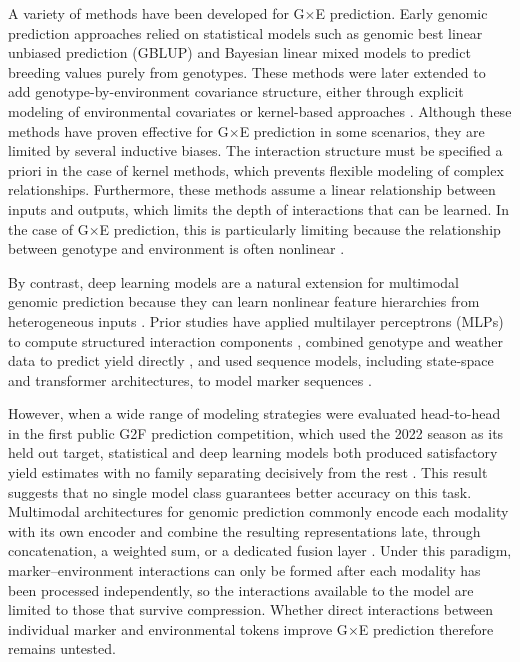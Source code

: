 A variety of methods have been developed for G$\times$E prediction. Early genomic prediction approaches relied on statistical models such as genomic best linear unbiased prediction (GBLUP) \cite{vanraden2008efficient} and Bayesian linear mixed models \cite{meuwissen2001prediction} to predict breeding values purely from genotypes. These methods were later extended to add genotype-by-environment covariance structure, either through explicit modeling of environmental covariates \cite{crossa2017genomic,heslot2014integrating} or kernel-based approaches \cite{jarquin2014reaction}. Although these methods have proven effective for G$\times$E prediction in some scenarios, they are limited by several inductive biases. The interaction structure must be specified a priori in the case of kernel methods, which prevents flexible modeling of complex relationships. Furthermore, these methods assume a linear relationship between inputs and outputs, which limits the depth of interactions that can be learned. In the case of G$\times$E prediction, this is particularly limiting because the relationship between genotype and environment is often nonlinear \cite{montesinos2021review}.

By contrast, deep learning models are a natural extension for multimodal genomic prediction because they can learn nonlinear feature hierarchies from heterogeneous inputs \cite{azodi2019benchmarking,montesinos2024multimodal}. Prior studies have applied multilayer perceptrons (MLPs) to compute structured interaction components \cite{montesinos2018multi}, combined genotype and weather data to predict yield directly \cite{shook2021crop}, and used sequence models, including state-space and transformer architectures, to model marker sequences \cite{caduceus,snvformer,wu2023transformer}.

However, when a wide range of modeling strategies were evaluated head-to-head in the first public G2F prediction competition, which used the 2022 season as its held out target, statistical and deep learning models both produced satisfactory yield estimates with no family separating decisively from the rest \cite{g2f-maize-2025}. This result suggests that no single model class guarantees better accuracy on this task. Multimodal architectures for genomic prediction commonly encode each modality with its own encoder and combine the resulting representations late, through concatenation, a weighted sum, or a dedicated fusion layer \cite{montesinos2024multimodal, shook2021crop}. Under this paradigm, marker--environment interactions can only be formed after each modality has been processed independently, so the interactions available to the model are limited to those that survive compression. Whether direct interactions between individual marker and environmental tokens improve G$\times$E prediction therefore remains untested.

